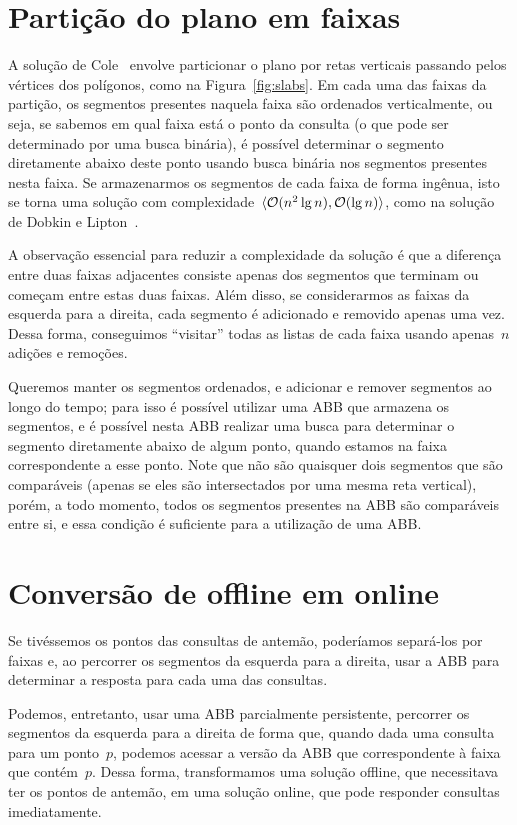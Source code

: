 \documentclass[main.tex]{subfiles}
\begin{document}
\section{Partição do plano em faixas}

A solução de Cole~\cite{Cole86} envolve particionar o plano por retas verticais passando pelos vértices dos polígonos, como na Figura~\ref{fig:slabs}. Em cada uma das faixas da partição, os segmentos presentes naquela faixa são ordenados verticalmente, ou seja, se sabemos em qual faixa está o ponto da consulta (o que pode ser determinado por uma busca binária), é possível determinar o segmento diretamente abaixo deste ponto usando busca binária nos segmentos presentes nesta faixa.
Se armazenarmos os segmentos de cada faixa de forma ingênua, isto se torna uma solução com complexidade~$\langle\mathcal{O}(n^2 \lg n), \mathcal{O}(\lg n)\rangle$, como na solução de Dobkin e Lipton~\cite{DobkinL76}.

A observação essencial para reduzir a complexidade da solução é que a diferença entre duas faixas adjacentes consiste apenas dos segmentos que terminam ou começam entre estas duas faixas. Além disso, se considerarmos as faixas da esquerda para a direita, cada segmento é adicionado e removido apenas uma vez. Dessa forma, conseguimos ``visitar'' todas as listas de cada faixa usando apenas~$n$ adições e remoções.

Queremos manter os segmentos ordenados, e adicionar e remover segmentos ao longo do tempo; para isso é possível utilizar uma ABB que armazena os segmentos, e é possível nesta ABB realizar uma busca para determinar o segmento diretamente abaixo de algum ponto, quando estamos na faixa correspondente a esse ponto. Note que não são quaisquer dois segmentos que são comparáveis (apenas se eles são intersectados por uma mesma reta vertical), porém, a todo momento, todos os segmentos presentes na ABB são comparáveis entre si, e essa condição é suficiente para a utilização de uma ABB.

\section{Conversão de offline em online}

Se tivéssemos os pontos das consultas de antemão, poderíamos separá-los por faixas e, ao percorrer os segmentos da esquerda para a direita, usar a ABB para determinar a resposta para cada uma das consultas.

Podemos, entretanto, usar uma ABB parcialmente persistente, percorrer os segmentos da esquerda para a direita de forma que, quando dada uma consulta para um ponto~$p$, podemos acessar a versão da ABB que correspondente à faixa que contém~$p$. Dessa forma, transformamos uma solução offline, que necessitava ter os pontos de antemão, em uma solução online, que pode responder consultas imediatamente.
\end{document}
